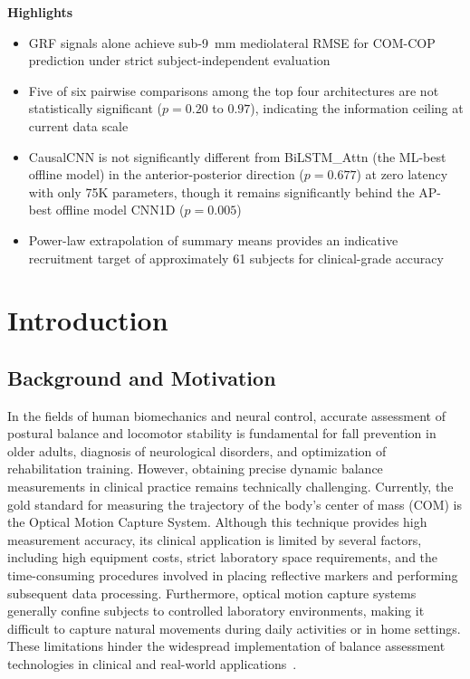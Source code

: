 \documentclass[preprint,12pt]{elsarticle}
\begin{document}
\clearpage
\begin{center}
  {\normalfont\large\bfseries Highlights}
\end{center}
\renewcommand{\labelitemi}{\textbullet}
\begin{itemize}
  \item GRF signals alone achieve sub-9~mm mediolateral RMSE for COM-COP prediction under strict subject-independent evaluation
  \item Five of six pairwise comparisons among the top four architectures are not statistically significant ($p = 0.20$ to $0.97$), indicating the information ceiling at current data scale
  \item CausalCNN is not significantly different from BiLSTM\_Attn (the ML-best offline model) in the anterior-posterior direction ($p = 0.677$) at zero latency with only 75K parameters, though it remains significantly behind the AP-best offline model CNN1D ($p = 0.005$)
  \item Power-law extrapolation of summary means provides an indicative recruitment target of approximately 61 subjects for clinical-grade accuracy
\end{itemize}
\clearpage

\section{Introduction}
\label{sec:intro}

\subsection{Background and Motivation}

In the fields of human biomechanics and neural control, accurate assessment of
postural balance and locomotor stability is fundamental for fall prevention in
older adults, diagnosis of neurological disorders, and optimization of
rehabilitation training.
However, obtaining precise dynamic balance measurements in clinical practice
remains technically challenging.
Currently, the gold standard for measuring the trajectory of the body's center of
mass (COM) is the Optical Motion Capture System.
Although this technique provides high measurement accuracy, its clinical
application is limited by several factors, including high equipment costs, strict
laboratory space requirements, and the time-consuming procedures involved in
placing reflective markers and performing subsequent data processing.
Furthermore, optical motion capture systems generally confine subjects to
controlled laboratory environments, making it difficult to capture natural
movements during daily activities or in home settings.
These limitations hinder the widespread implementation of balance assessment
technologies in clinical and real-world applications~\cite{s23104933}.
\end{document}
